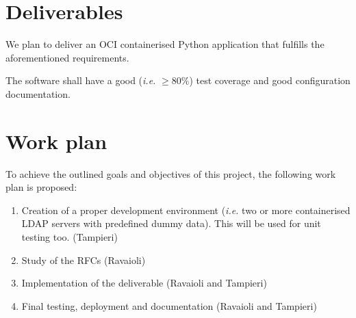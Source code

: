 \documentclass[a4paper,12pt]{article}
\begin{document}
    \section{Deliverables}
    \par We plan to deliver an OCI containerised Python application that fulfills the aforementioned
    requirements.
    \par The software shall have a good (\emph{i.e.} $\geq80\%$) test coverage and good configuration
    documentation.
    \section{Work plan}
        \par To achieve the outlined goals and objectives of this project, the following work plan is proposed:
        \begin{enumerate}
            \item Creation of a proper development environment (\emph{i.e.} two or more containerised
            LDAP servers with predefined dummy data). This will be used for unit testing too. (Tampieri)
            \item Study of the RFCs (Ravaioli)
            \item Implementation of the deliverable (Ravaioli and Tampieri)
            \item Final testing, deployment and documentation (Ravaioli and Tampieri)
        \end{enumerate}
\end{document}
